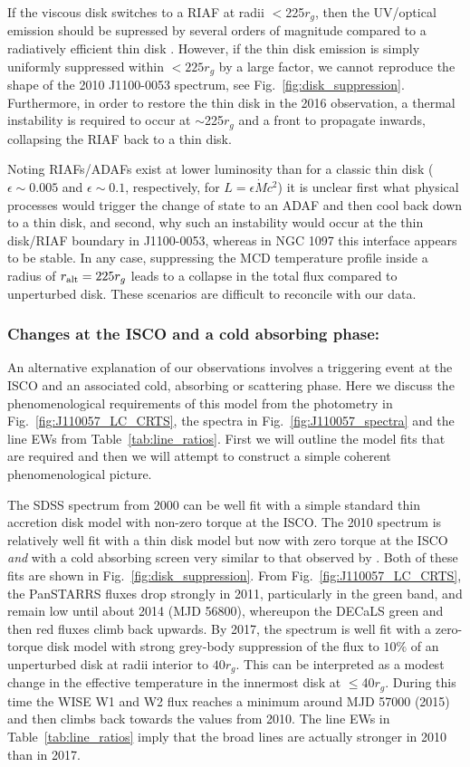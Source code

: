 \documentclass[a4paper,fleqn,usenatbib]{mnras}
\begin{document}
If the viscous disk switches to a RIAF at radii $<$225$r_{g}$, then
the UV/optical emission should be supressed by several orders of
magnitude compared to a radiatively efficient thin disk
\citep{Narayan1998, Abramowicz2002, Abramowicz2013}. However, if the
thin disk emission is simply uniformly suppressed within $<225r_{g}$
by a large factor, we cannot reproduce the shape of the 2010
J1100-0053 spectrum, see Fig.~\ref{fig:disk_suppression}. Furthermore,
in order to restore the thin disk in the 2016 observation, a thermal
instability is required to occur at $\sim$225$r_{g}$ and a front to
propagate inwards, collapsing the RIAF back to a thin disk.

Noting RIAFs/ADAFs exist at lower luminosity than for a classic thin
disk ($\epsilon \sim 0.005$ and $\epsilon \sim 0.1$, respectively, for
$L=\epsilon \dot{M} c^{2}$) it is unclear first what physical
processes would trigger the change of state to an ADAF and then cool
back down to a thin disk, and second, why such an instability would
occur at the thin disk/RIAF boundary in J1100-0053, whereas in NGC
1097 this interface appears to be stable. In any case, suppressing the
MCD temperature profile inside a radius of $r_{{\rm alt}} = 225 r_{g}$
leads to a collapse in the total flux compared to unperturbed disk.
These scenarios are difficult to reconcile with our data.


\subsubsection{Changes at the ISCO and a cold absorbing phase:}
An alternative explanation of our observations involves a triggering
event at the ISCO and an associated cold, absorbing or scattering
phase. Here we discuss the phenomenological requirements of this model
from the photometry in Fig.~\ref{fig:J110057_LC_CRTS}, the spectra in
Fig.~\ref{fig:J110057_spectra} and the line EWs from
Table~\ref{tab:line_ratios}. First we will outline the model fits that
are required and then we will attempt to construct a simple coherent
phenomenological picture.

The SDSS spectrum from 2000 can be well fit with a simple standard
thin accretion disk model with non-zero torque at the ISCO. The 2010
spectrum is relatively well fit with a thin disk model but now with
zero torque at the ISCO \emph{and} with a cold absorbing screen very
similar to that observed by \citep{Guo2016}. Both of these fits are
shown in Fig.~\ref{fig:disk_suppression}. From
Fig.~\ref{fig:J110057_LC_CRTS}, the PanSTARRS fluxes drop strongly in
2011, particularly in the green band, and remain low until about 2014
(MJD 56800), whereupon the DECaLS green and then red fluxes climb back
upwards. By 2017, the spectrum is well fit with a zero-torque disk
model with strong grey-body suppression of the flux to $10\%$ of an
unperturbed disk at radii interior to $40r_{g}$. This can be
interpreted as a modest change in the effective temperature in the
innermost disk at $\leq$40$r_{g}$. During this time the WISE W1 and W2
flux reaches a minimum around MJD 57000 (2015) and then climbs back
towards the values from 2010. The line EWs in
Table~\ref{tab:line_ratios} imply that the broad lines are actually
stronger in 2010 than in 2017.
\end{document}
